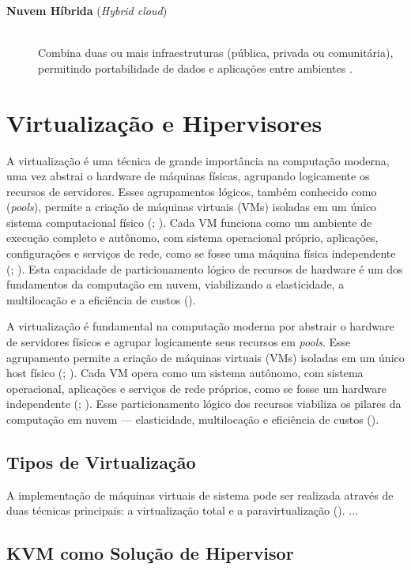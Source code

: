 \begin{itemize}
\begin{description}
  \item[\textbf{Nuvem Híbrida} (\textit{Hybrid cloud})] \hfill \\ Combina duas ou mais infraestruturas (pública, privada ou comunitária), permitindo portabilidade de dados e aplicações entre ambientes \cite{mell2011}.
\end{description}
 

\section{Virtualização e Hipervisores}
A virtualização é uma técnica de grande importância na computação moderna, uma vez  abstrai o hardware de máquinas físicas, agrupando logicamente os recursos de servidores. Esses agrupamentos lógicos, também conhecido como (\textit{pools}), permite a criação de máquinas virtuais (VMs) isoladas em um único sistema computacional físico (\cite{carissimi2008}; \cite{kominos2017}). Cada VM funciona como um ambiente de execução completo e autônomo, com sistema operacional próprio, aplicações, configurações e  serviços de rede, como se fosse uma máquina física independente (\cite{carissimi2008}; \cite{smith2005}). Esta capacidade de particionamento lógico de recursos de hardware é um dos fundamentos da computação em nuvem, viabilizando a elasticidade, a multilocação e a eficiência de custos (\cite{chawla2025}).

A virtualização é fundamental na computação moderna por abstrair o hardware de servidores físicos e agrupar logicamente seus recursos em \textit{pools}. Esse agrupamento permite a criação de máquinas virtuais (VMs) isoladas em um único host físico (\cite{carissimi2008}; \cite{kominos2017}). Cada VM opera como um sistema autônomo, com sistema operacional, aplicações e serviços de rede próprios, como se fosse um hardware independente (\cite{carissimi2008}; \cite{smith2005}). Esse particionamento lógico dos recursos viabiliza os pilares da computação em nuvem — elasticidade, multilocação e eficiência de custos (\cite{chawla2025}).

\subsection{Tipos de Virtualização}
A implementação de máquinas virtuais de sistema pode ser realizada através de duas técnicas principais: a virtualização total e a paravirtualização (\cite{carissimi2008}).
{{ ... }}

\subsection{KVM como Solução de Hipervisor}


\end{itemize}
